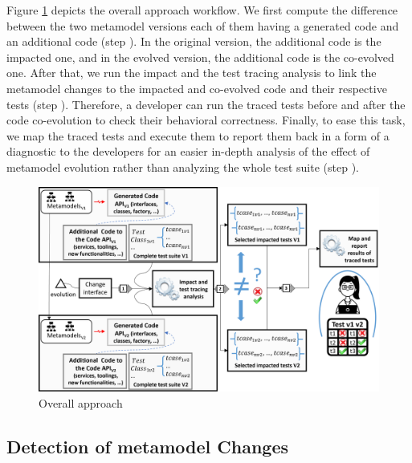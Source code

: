 Figure \ref{fig:appraoch} depicts the overall approach workflow. We first compute the difference between the two metamodel versions each of them having a generated code and an additional code (step {\small{}}). In the original version, the additional code is the impacted one, and in the evolved version, the additional code is the co-evolved one. 
After that, we run the impact and the test tracing analysis to link the metamodel changes to the impacted and co-evolved code and their respective tests (step {\small{}}). Therefore, a developer can run the traced tests before and after the code co-evolution to check their behavioral correctness. Finally, to ease this task, we map the traced tests and execute them to report them back in a form of a diagnostic to the developers for an easier in-depth analysis of the effect of metamodel evolution rather than analyzing the whole test suite (step {\small{}}). 


\begin{figure}[tb]
	\centering
	\includegraphics[width=1\textwidth]{./pics/chapter2pics/OverallApproachV2.png}
	\caption{Overall approach}
	\label{fig:appraoch}
\end{figure}


\subsection{Detection of metamodel Changes}\label{sec:changes}


